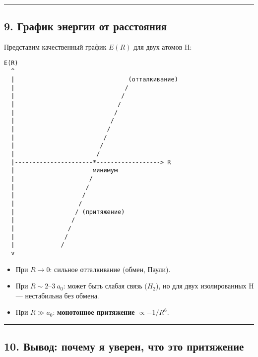 \documentclass[11pt]{article}
\providecommand{\tightlist}{%
      \setlength{\itemsep}{0pt}\setlength{\parskip}{0pt}}
\begin{document}
\begin{center}\rule{0.5\linewidth}{\linethickness}\end{center}

\subsection{9. График энергии от
расстояния}\label{ux433ux440ux430ux444ux438ux43a-ux44dux43dux435ux440ux433ux438ux438-ux43eux442-ux440ux430ux441ux441ux442ux43eux44fux43dux438ux44f}

Представим качественный график \(E(R)\) для двух атомов H:

\begin{verbatim}
E(R)
  ^
  |                                (отталкивание)
  |                               /
  |                              /
  |                             /
  |                            /
  |                           /
  |                          /
  |                         /
  |                        /
  |                       /
  |----------------------*------------------> R
  |                      минимум
  |                     /
  |                    /
  |                   /
  |                  /
  |                 / (притяжение)
  |                /
  |               /
  |              /
  |             /
  v
\end{verbatim}

\begin{itemize}
\tightlist
\item
  При \(R \to 0\): сильное отталкивание (обмен, Паули).
\item
  При \(R \sim 2–3~a_0\): может быть слабая связь (\(H_{2}\)), но для
  двух изолированных H --- нестабильна без обмена.
\item
  При \(R \gg a_0\): \textbf{монотонное притяжение \(\propto -1/R^6\)}.
\end{itemize}

\begin{center}\rule{0.5\linewidth}{\linethickness}\end{center}

\subsection{10. Вывод: почему я уверен, что это
притяжение}\label{ux432ux44bux432ux43eux434-ux43fux43eux447ux435ux43cux443-ux44f-ux443ux432ux435ux440ux435ux43d-ux447ux442ux43e-ux44dux442ux43e-ux43fux440ux438ux442ux44fux436ux435ux43dux438ux435}
\end{document}
